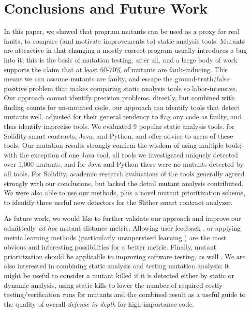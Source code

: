 \section{Conclusions and Future Work}

In this paper, we showed that program mutants can be used as a proxy
for real faults, to compare (and motivate improvements to) static
analysis tools.  Mutants are attractive in that changing a mostly
correct program usually introduces a bug into it; this is the basis of
mutation testing, after all, and a large body of work supports the
claim that at least 60-70\% of mutants are fault-inducing.   This
means we can assume mutants are faulty, and escape the
ground-truth/false positive problem that makes comparing static
analysis tools so labor-intensive.  Our approach cannot identify precision
problems, directly, but combined with finding counts for un-mutated
code, our approach can identify tools that detect mutants well,
adjusted for their general tendency to flag any code as faulty, and
thus identify imprecise tools.  We
evaluated 9 popular static analysis tools, for Solidity smart contracts, Java,
and Python, and offer advice to users of these tools.  Our mutation
results strongly confirm the wisdom of using multiple tools; with the
exception of one Java tool, all tools we investigated uniquely
detected over 1,000 mutants, and for Java and Python there were no
mutants detected by all tools. For Solidity,
academic research evaluations of the tools generally agreed strongly
with our conclusions, but lacked the detail mutant analysis contributed.
We were also able to use our methods, plus a novel mutant prioritization scheme, to
identify three useful new detectors for the Slither smart contract
analyzer.

As future work, we would like to further validate our approach and
improve our admittedly \emph{ad hoc} mutant distance metric.  Allowing
user feedback \cite{EndUserMistake,OnlyOracle}, or applying metric
learning methods \cite{kulis2012metric} (particularly unsupervised
learning \cite{scholkopf1998nonlinear,tipping1999probabilistic}) are
the most obvious and interesting possibilities for a better metric.
Finally, mutant prioritization should be applicable to improving
software testing, as well \cite{groce2018verified}.  We are also interested in combining static analysis and testing mutation analysis: it might be useful to consider a mutant killed if it is detected either by static or dynamic analysis, using static kills to lower the number of required costly testing/verification runs for mutants and the combined result as a useful guide to the quality of overall \emph{defense in depth} for high-importance code.